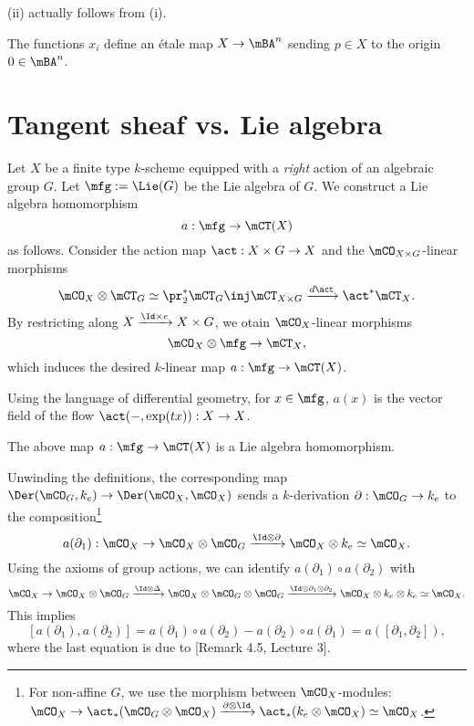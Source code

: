 	\begin{rem}
		(ii) actually follows from (i).
	\end{rem}

	\begin{rem}
		The functions $x_i$ define an étale map $X\to \mBA^n$ sending $p\in X$ to the origin $0\in \mBA^n$.
	\end{rem}




\section{Tangent sheaf vs. Lie algebra}
	
	\begin{constr}
		Let $X$ be a finite type $k$-scheme equipped with a \emph{right} action of an algebraic group $G$. Let $\mfg:=\Lie(G)$ be the Lie algebra of $G$. We construct a Lie algebra homomorphism
		\[
			a: \mfg\to \mCT(X)
		\]
		as follows. Consider the action map $\act: X\mt G \to X$ and the $\mCO_{X\mt G}$-linear morphisms
		\[
			\mCO_X \ot \mCT_{G} \simeq \pr_2^*\mCT_{G} \inj \mCT_{X\mt G} \xrightarrow{d\act} \act^*\mCT_{X}.
		\]
		By restricting along $X \xrightarrow{\Id\mt e} X\mt G$, we otain $\mCO_X$-linear morphisms
		\[
			\mCO_X \ot \mfg  \to \mCT_{X},
		\]
		which induces the desired $k$-linear map $a: \mfg \to \mCT(X)$.
	\end{constr}

	\begin{rem}
		Using the language of differential geometry, for $x\in \mfg$, $a(x)$ is the vector field of the flow $\act(-,\exp(tx)): X \to X$. 
	\end{rem}

	\begin{lem}
		The above map $a: \mfg \to \mCT(X)$ is a Lie algebra homomorphism.
	\end{lem}

	\proof
		Unwinding the definitions, the corresponding map $\Der(\mCO_G,k_e ) \to \Der(\mCO_X,\mCO_X )$ sends a $k$-derivation $\partial: \mCO_G \to k_e$ to the composition\footnote{For non-affine $G$, we use the morphism between $\mCO_X$-modules: $\mCO_X \to \act_*(\mCO_G \ot \mCO_X) \xrightarrow{\partial\ot \Id} \act_*(k_e \ot \mCO_X) \simeq \mCO_X$.}
		\[
			a(\partial_1):\mCO_X \to \mCO_X \ot \mCO_G \xrightarrow{\Id \ot \partial} \mCO_X \ot k_e \simeq \mCO_X.
		\]
		Using the axioms of group actions, we can identify $a(\partial_1)\circ a(\partial_2)$ with
		\[
			\mCO_X \to \mCO_X \ot \mCO_G \xrightarrow{ \Id \ot \Delta } \mCO_X \ot \mCO_G \ot \mCO_G \xrightarrow{ \Id \ot \partial_1 \ot \partial_2 } \mCO_X \ot k_e \ot k_e \simeq \mCO_X.
		\]
		This implies 
		\[
			[a(\partial_1),a(\partial_2)] = a(\partial_1)\circ a(\partial_2) - a(\partial_2)\circ a(\partial_1) = a( [\partial_1, \partial_2] ),
		\]
		where the last equation is due to [Remark 4.5, Lecture 3].

